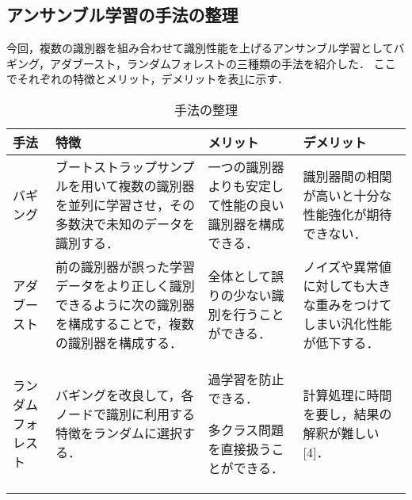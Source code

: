 \documentclass[dvipdfmx]{jreport}
\begin{document}
\newpage
\subsection{アンサンブル学習の手法の整理}
今回，複数の識別器を組み合わせて識別性能を上げるアンサンブル学習としてバギング，アダブースト，ランダムフォレストの三種類の手法を紹介した．
ここでそれぞれの特徴とメリット，デメリットを表\ref{tab:4}に示す．

\begin{table}[h]
    \caption{手法の整理}\label{tab:4}
    \centering
    \renewcommand{\arraystretch}{1.5}
    \begin{tabular}{|>{\centering\arraybackslash}m{3cm}|>{\centering\arraybackslash}m{4cm}|>{\centering\arraybackslash}m{4cm}|>{\centering\arraybackslash}m{4cm}|}
        \hline
        \rowcolor{gray!30} %
        \textbf{手法} & \textbf{特徴} & \textbf{メリット} & \textbf{デメリット} \\
        \hline
        バギング&
        ブートストラップサンプルを用いて複数の識別器を並列に学習させ，その多数決で未知のデータを識別する．
        &
        一つの識別器よりも安定して性能の良い識別器を構成できる．
        &
        識別器間の相関が高いと十分な性能強化が期待できない．
        \\
        \hline
        アダブースト&
        前の識別器が誤った学習データをより正しく識別できるように次の識別器を構成することで，複数の識別器を構成する．
        &
        全体として誤りの少ない識別を行うことができる．
        &
        ノイズや異常値に対しても大きな重みをつけてしまい汎化性能が低下する．
        \\
        \hline
        ランダムフォレスト
        &
        バギングを改良して，各ノードで識別に利用する特徴をランダムに選択する．
        &
        過学習を防止できる．
        
        多クラス問題を直接扱うことができる．
        &
        計算処理に時間を要し，結果の解釈が難しい[4]．\\
        \hline
    \end{tabular}
\end{table}
\end{document}
